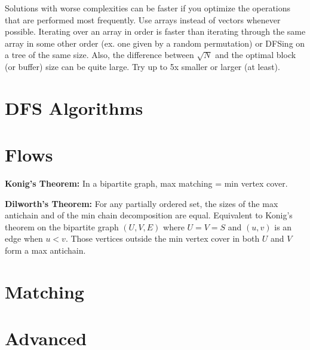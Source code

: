 		Solutions with worse complexities can be faster if you optimize the operations that are performed most frequently. Use arrays instead of vectors whenever possible. Iterating over an array in order is faster than iterating through the same array in some other order (ex. one given by a random permutation) or DFSing on a tree of the same size. Also, the difference between $\sqrt N$ and the optimal block (or buffer) size can be quite large. Try up to 5x smaller or larger (at least).


\section{DFS Algorithms}


\section{Flows}

	\textbf{Konig's Theorem:} In a bipartite graph, max matching = min vertex cover.

	\textbf{Dilworth's Theorem:} For any partially ordered set, the sizes of the max antichain and of the min chain decomposition are equal. Equivalent to Konig's theorem on the bipartite graph $(U,V,E)$ where $U=V=S$ and $(u,v)$ is an edge when $u<v$. Those vertices outside the min vertex cover in both $U$ and $V$ form a max antichain.




\section{Matching}


\section{Advanced}

